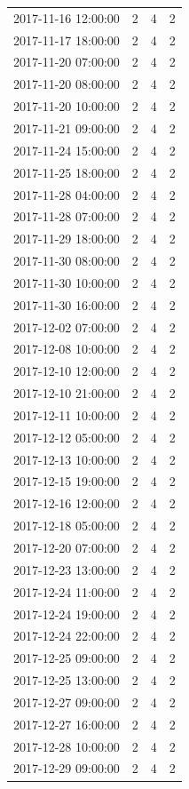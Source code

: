 \begin{tabular}{lrrr}
2017-11-16 12:00:00 & 2 & 4 & 2 \\
2017-11-17 18:00:00 & 2 & 4 & 2 \\
2017-11-20 07:00:00 & 2 & 4 & 2 \\
2017-11-20 08:00:00 & 2 & 4 & 2 \\
2017-11-20 10:00:00 & 2 & 4 & 2 \\
2017-11-21 09:00:00 & 2 & 4 & 2 \\
2017-11-24 15:00:00 & 2 & 4 & 2 \\
2017-11-25 18:00:00 & 2 & 4 & 2 \\
2017-11-28 04:00:00 & 2 & 4 & 2 \\
2017-11-28 07:00:00 & 2 & 4 & 2 \\
2017-11-29 18:00:00 & 2 & 4 & 2 \\
2017-11-30 08:00:00 & 2 & 4 & 2 \\
2017-11-30 10:00:00 & 2 & 4 & 2 \\
2017-11-30 16:00:00 & 2 & 4 & 2 \\
2017-12-02 07:00:00 & 2 & 4 & 2 \\
2017-12-08 10:00:00 & 2 & 4 & 2 \\
2017-12-10 12:00:00 & 2 & 4 & 2 \\
2017-12-10 21:00:00 & 2 & 4 & 2 \\
2017-12-11 10:00:00 & 2 & 4 & 2 \\
2017-12-12 05:00:00 & 2 & 4 & 2 \\
2017-12-13 10:00:00 & 2 & 4 & 2 \\
2017-12-15 19:00:00 & 2 & 4 & 2 \\
2017-12-16 12:00:00 & 2 & 4 & 2 \\
2017-12-18 05:00:00 & 2 & 4 & 2 \\
2017-12-20 07:00:00 & 2 & 4 & 2 \\
2017-12-23 13:00:00 & 2 & 4 & 2 \\
2017-12-24 11:00:00 & 2 & 4 & 2 \\
2017-12-24 19:00:00 & 2 & 4 & 2 \\
2017-12-24 22:00:00 & 2 & 4 & 2 \\
2017-12-25 09:00:00 & 2 & 4 & 2 \\
2017-12-25 13:00:00 & 2 & 4 & 2 \\
2017-12-27 09:00:00 & 2 & 4 & 2 \\
2017-12-27 16:00:00 & 2 & 4 & 2 \\
2017-12-28 10:00:00 & 2 & 4 & 2 \\
2017-12-29 09:00:00 & 2 & 4 & 2 \\

\end{tabular}
